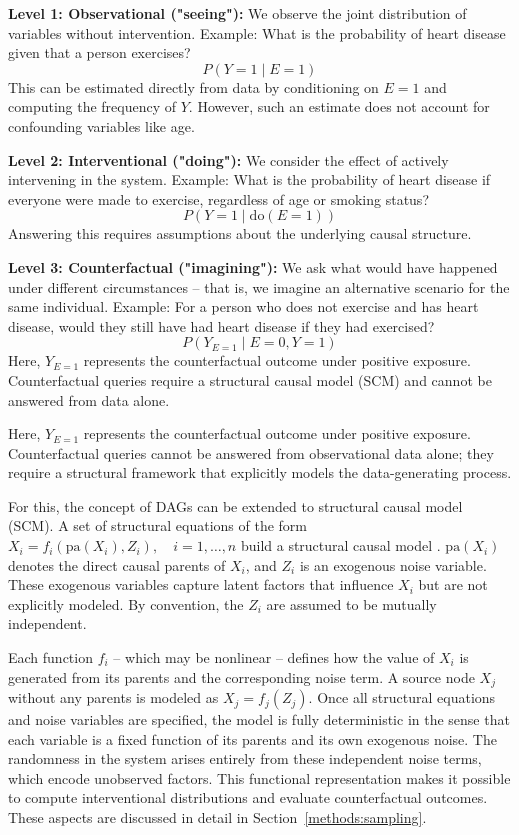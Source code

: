 \textbf{Level 1: Observational ("seeing"):}  
We observe the joint distribution of variables without intervention.  
Example: What is the probability of heart disease given that a person exercises?  
\[
P(Y = 1 \mid E = 1)
\]
This can be estimated directly from data by conditioning on $E = 1$ and computing the frequency of $Y$. However, such an estimate does not account for confounding variables like age.



\textbf{Level 2: Interventional ("doing"):}  
We consider the effect of actively intervening in the system.  
Example: What is the probability of heart disease if everyone were made to exercise, regardless of age or smoking status?  
\[
P(Y = 1 \mid \text{do}(E = 1))
\]
Answering this requires assumptions about the underlying causal structure.



\textbf{Level 3: Counterfactual ("imagining"):}  
We ask what would have happened under different circumstances -- that is, we imagine an alternative scenario for the same individual.  
Example: For a person who does not exercise and has heart disease, would they still have had heart disease if they had exercised?  
\[
P(Y_{E=1} \mid E = 0, Y = 1)
\]
Here, $Y_{E=1}$ represents the counterfactual outcome under positive exposure. Counterfactual queries require a structural causal model (SCM) and cannot be answered from data alone. 

Here, $Y_{E=1}$ represents the counterfactual outcome under positive exposure. Counterfactual queries cannot be answered from observational data alone; they require a structural framework that explicitly models the data-generating process. 





For this, the concept of DAGs can be extended to structural causal model (SCM). A set of structural equations of the form $X_i = f_i(\text{pa}(X_i), Z_i), \quad i = 1, \dots, n$ build a structural causal model \citep{pearl_book2009}.  $\text{pa}(X_i)$ denotes the direct causal parents of $X_i$, and $Z_i$ is an exogenous noise variable. These exogenous variables capture latent factors that influence $X_i$ but are not explicitly modeled. By convention, the $Z_i$ are assumed to be mutually independent.

Each function $f_i$ -- which may be nonlinear -- defines how the value of $X_i$ is generated from its parents and the corresponding noise term. A source node $X_j$ without any parents is modeled as $X_j = f_j(Z_j)$. Once all structural equations and noise variables are specified, the model is fully deterministic in the sense that each variable is a fixed function of its parents and its own exogenous noise. The randomness in the system arises entirely from these independent noise terms, which encode unobserved factors. This functional representation makes it possible to compute interventional distributions and evaluate counterfactual outcomes. These aspects are discussed in detail in Section~\ref{methods:sampling}.


